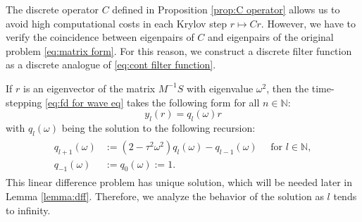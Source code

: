 \documentclass[a4paper,11pt,bibliography=totoc,listof=totoc,headinclude=true,cleardoublepage=empty,oneside]{scrbook}
\newcommand{\N}{\mathbb{N}}
\begin{document}
The discrete operator $C$ defined in Proposition \ref{prop:C operator} allows us to avoid high computational costs in each Krylov step $r \mapsto Cr$. However, we have to verify the coincidence between eigenpairs of $C$ and eigenpairs of the original problem \eqref{eq:matrix form}. For this reason, we construct a discrete filter function as a discrete analogue of \eqref{eq:cont filter function}.

If $r$ is an eigenvector of the matrix $M^{-1}S$ with eigenvalue $\omega^2$, then the time-stepping \eqref{eq:fd for wave eq} takes the following form for all $n\in \N$:
\begin{equation}\label{eq:y_l q_l}
    y_l(r) = q_l(\omega)r  
\end{equation}
with $q_l(\omega)$ being the solution to the following recursion:
\begin{align}\label{eq:q def}
    \begin{split}
        q_{l+1}(\omega) &:= (2-\tau^2\omega^2) q_l(\omega) - q_{l-1}(\omega) \quad \text{ for } l \in \N,\\
        q_{-1}(\omega) &:= q_0(\omega) := 1.
    \end{split}
\end{align}
This linear difference problem has unique solution, which will be needed later in Lemma \ref{lemma:dff}. Therefore, we analyze the behavior of the solution as $l$ tends to infinity.
\end{document}
